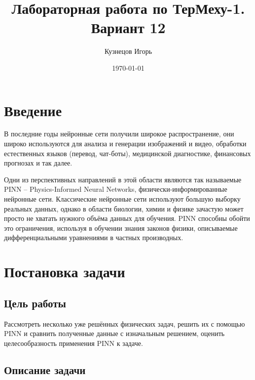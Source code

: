 \documentclass[a4paper,12pt]{article} %
\author{Кузнецов Игорь}
\title{Лабораторная работа по ТерМеху-1. Вариант 12}
\date{\today}
\begin{document}
\newcommand{\brv}[1]{{\left| #1 \right|}}
\newcommand{\brr}[1]{{\left( #1 \right)}}
\newcommand{\brs}[1]{{\left[ #1 \right]}}
\newcommand{\brc}[1]{{\left\{ #1 \right\}}}
\newcommand{\brn}[1]{{\left\lVert #1 \right\rVert}}
\newcommand{\bra}[1]{{\left\langle #1 \right\rangle}}
\newcommand{\brrl}[1]{{\left( #1 \right]}}
\newcommand{\brrr}[1]{{\left[ #1 \right)}}
\newcommand{\under}[2]{{\underset{#2}{\underbrace{#1}}}}
\newcommand{\strm}[1]{\underset{#1}{\rightarrow}}
\tableofcontents
\newpage

\section{Введение}

В последние годы нейронные сети получили широкое распространение, они широко используются для анализа и генерации изображений и видео, обработки естественных языков (перевод, чат-боты), медицинской диагностике, финансовых прогнозах и так далее.

Одни из перспективных направлений в этой области являются так называемые PINN -- Physics-Informed Neural Networks, физически-инфор\-мированные нейронные сети. Классические нейронные сети используют большую выборку реальных данных, однако в области биологии, химии и физике зачастую может просто не хватать нужного объёма данных для обучения. PINN способны обойти это ограничения, используя в обучении знания законов физики, описываемые дифференциальными уравнениями в частных производных.
\newpage

\section{Постановка задачи}

\subsection{Цель работы}

Рассмотреть несколько уже решённых физических задач, решить их с помощью PINN и сравнить полученные данные с изначальным решением, оценить целесообразность применения PINN к задаче.

\subsection{Описание задачи}
\end{document}
